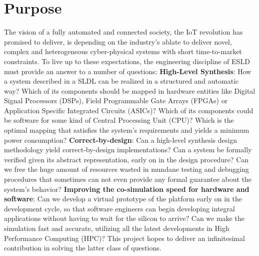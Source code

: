 \documentclass[12pt,twoside]{article}
\begin{document}
\section{Purpose}
\label{sec:orgheadline12}
The vision of a fully automated and connected society, the IoT revolution has promised to deliver,
is depending on the industry's ablate to deliver novel, complex and heterogeneous cyber-physical systems with short time-to-market constraints.
To live up to these expectations, the engineering discipline of ESLD must provide an answer to a number of questions:
\newline
\textbf{High-Level Synthesis}: How a system described in a SLDL can be realized in a structured and automatic way? 
Which of its components should be mapped in hardware entities like Digital Signal Processors (DSPs), Field Programmable Gate Arrays (FPGAs) or Application Specific Integrated Circuits (ASICs)?
Which of its components could be software for some kind of Central Processing Unit (CPU)?
Which is the optimal mapping that satisfies the system's requirements and yields a minimum power consumption?
\newline
\textbf{Correct-by-design}: Can a high-level synthesis design methodology yield correct-by-design implementations?
Can a system be formally verified given its abstract representation, early on in the design procedure?
Can we free the huge amount of resources wasted in mundane testing and debugging procedures that sometimes can not even provide any formal guarantee about the system's behavior?
\newline
\textbf{Improving the co-simulation speed for hardware and software}: Can we develop a virtual prototype of the platform early on in the development cycle, 
so that software engineers can begin developing integral applications without having to wait for the silicon to arrive?
Can we make the simulation fast and accurate, utilizing all the latest developments in High Performance Computing (HPC)?
This project hopes to deliver an infinitesimal contribution in solving the latter class of questions.
\end{document}

